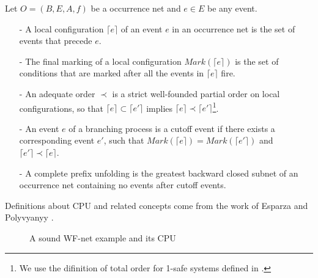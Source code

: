 \documentclass[dvips,...]{llncs}
\begin{document}
\begin{definition}\label{def:cpu}
Let $O=(B,E,A,f)$ be a occurrence net and $e\in E$ be any event.
	\begin{itemize}
		\item[-] A local configuration $\lceil e\rceil$ of an event $e$ in an occurrence net is the set of events that precede $e$.
		\item[-] The final marking of a local configuration $Mark(\lceil e\rceil)$ is the set of conditions that are marked after all the events in $\lceil e\rceil$ fire.
		\item[-] An adequate order $\prec$ is a strict well-founded partial order on local configurations, so that $\lceil e\rceil\subset\lceil e'\rceil$ implies $\lceil e\rceil\prec\lceil e'\rceil$\footnote{We use the difinition of total order for 1-safe systems defined in \cite{esparza1996improvement}.}.
		\item[-] An event $e$ of a branching process is a cutoff event if there exists a corresponding event $e'$, such that $Mark(\lceil e\rceil)=Mark(\lceil e'\rceil)$ and $\lceil e'\rceil\prec\lceil e\rceil$.
		\item[-] A complete prefix unfolding is the greatest backward closed subnet of an occurrence net containing no events after cutoff events.
	\end{itemize}
\end{definition}

Definitions about CPU and related concepts come from the work of Esparza \cite{esparza1996improvement} and Polyvyanyy \cite{polyvyanyy2010structuring}.

\begin{figure}[htbp]
\centering
{}
\caption{A sound WF-net example and its CPU\label{fig:examplePetriAndCpu}}
\end{figure}
\end{document}

